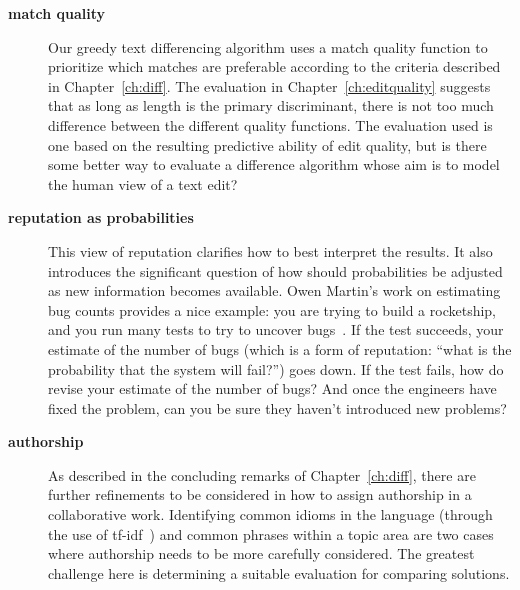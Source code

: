 \begin{description}
\item[\textbf{match quality}] Our greedy text differencing algorithm
    uses a match quality function to prioritize which matches are
    preferable according to the criteria described in Chapter~\ref{ch:diff}.
    The evaluation in Chapter~\ref{ch:editquality}
    suggests that as long as length
    is the primary discriminant, there is not too much difference
    between the different quality functions.
    The evaluation used is one based on the resulting predictive ability
    of edit quality, but is there some better way to evaluate a difference
    algorithm whose aim is to model the human view of a text edit?

\item[\textbf{reputation as probabilities}]  This view of reputation
    clarifies how to best interpret the results.
    It also introduces the significant question of how should probabilities
    be adjusted as new information becomes available.
    Owen Martin's work on estimating bug counts provides a nice example:
    you are trying to build a rocketship, and you run many
    tests to try to uncover bugs~\cite{Martin2011}.
    If the test succeeds, your estimate
    of the number of bugs (which is a form of reputation: ``what is
    the probability that the system will fail?'') goes down.
    If the test fails, how do revise your estimate of the number
    of bugs?  And once the engineers have fixed the problem, can
    you be sure they haven't introduced new problems?

\item[\textbf{authorship}]  As described in the concluding remarks of
    Chapter~\ref{ch:diff}, there are further refinements to be
    considered in how to assign authorship in a collaborative work.
    Identifying common idioms in the language (\eg through the use of
    tf-idf~\cite{Jones1972}) and common phrases within a topic area
    are two cases where authorship needs to be more carefully considered.
    The greatest challenge here is
    determining a suitable evaluation for comparing solutions.

\end{description}

